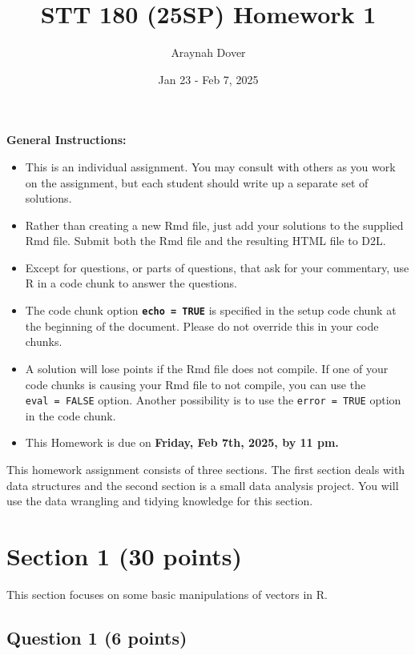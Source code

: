 \documentclass[
]{article}
\title{STT 180 (25SP) Homework 1}
\author{Araynah Dover}
\date{Jan 23 - Feb 7, 2025}
\begin{document}
\maketitle

{
\setcounter{tocdepth}{4}
\tableofcontents
}
\textbf{General Instructions:}

\begin{itemize}
\item
  This is an individual assignment. You may consult with others as you
  work on the assignment, but each student should write up a separate
  set of solutions.
\item
  Rather than creating a new Rmd file, just add your solutions to the
  supplied Rmd file. Submit both the Rmd file and the resulting HTML
  file to D2L.
\item
  Except for questions, or parts of questions, that ask for your
  commentary, use R in a code chunk to answer the questions.
\item
  The code chunk option \textbf{\texttt{echo\ =\ TRUE}} is specified in
  the setup code chunk at the beginning of the document. Please do not
  override this in your code chunks.
\item
  A solution will lose points if the Rmd file does not compile. If one
  of your code chunks is causing your Rmd file to not compile, you can
  use the \texttt{eval\ =\ FALSE} option. Another possibility is to use
  the \texttt{error\ =\ TRUE} option in the code chunk.
\item
  This Homework is due on \textbf{Friday, Feb 7th, 2025, by 11 pm.}
\end{itemize}

This homework assignment consists of three sections. The first section
deals with data structures and the second section is a small data
analysis project. You will use the data wrangling and tidying knowledge
for this section.

\section{Section 1 (30 points)}\label{section-1-30-points}

This section focuses on some basic manipulations of vectors in R.

\subsection{Question 1 (6 points)}\label{question-1-6-points}
\end{document}
